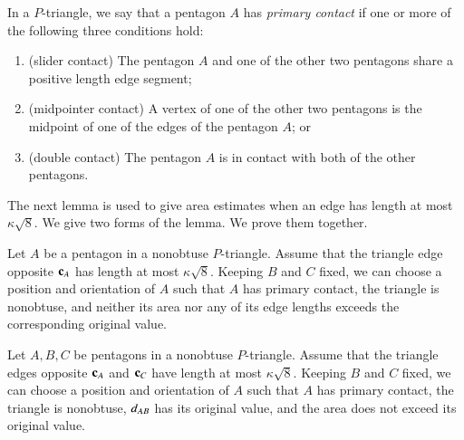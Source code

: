 \begin{definition}
In a $P$-triangle, we say that a pentagon $A$ has {\it primary
  contact} if one or more of the following three conditions hold:
\begin{enumerate}
\item (slider contact) The pentagon $A$ and one of the other two pentagons
   share a positive length edge segment;
\item (midpointer contact) A vertex of one of the other two pentagons
  is the midpoint of one of the edges of the pentagon $A$; or
\item (double contact) The pentagon $A$ is in contact with both of the
  other pentagons.
\end{enumerate}
\end{definition}

The next lemma is used to give area estimates when an edge has length
at most $\kappa\sqrt{8}$.  We give two forms of the lemma.  We prove
them together.

\begin{lemma} 
  Let $A$ be a pentagon in a nonobtuse $P$-triangle.  Assume that the
  triangle edge opposite ${\mathbf c}_A$ has length at most $\kappa\sqrt{8}$.
  Keeping $B$ and $C$ fixed, we can choose a position and orientation
of $A$ such that $A$ has primary contact, the triangle is nonobtuse,
and neither its area nor any of its edge lengths exceeds the
corresponding original value.
\end{lemma}

\begin{lemma} 
  Let $A,B,C$ be pentagons in a nonobtuse $P$-triangle.  Assume that
  the triangle edges opposite ${\mathbf c}_A$ and ${\mathbf c}_C$ have length at most
  $\kappa\sqrt{8}$.
  Keeping $B$ and $C$ fixed, we can choose a position and orientation
of $A$ such that $A$ has primary contact, the triangle is nonobtuse,
$d_{AB}$ has its original value, and the area does not exceed
its original value.
\end{lemma}

